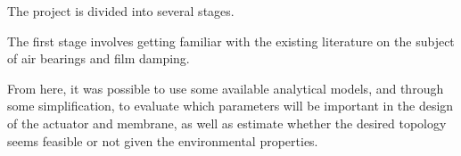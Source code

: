 The project is divided into several stages.

The first stage involves getting familiar with the existing literature on the
subject of air bearings and film damping.

From here, it was possible to use some available analytical models, and through
some simplification, to evaluate which parameters will be important in the
design of the actuator and membrane, as well as estimate whether the desired
topology seems feasible or not given the environmental properties.




